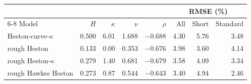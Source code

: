 \begin{tabular}{lrrrrrrr}
\toprule
 & & & & & \multicolumn{3}{c}{RMSE (\%)}\\
\cmidrule(lr){6-8}
Model & $H$ & $\kappa$ & $\nu$ & $\rho$ & All & Short & Standard\\
\midrule
Heston-curve-$\kappa$ & 0.500 & 6.01 & 1.688 & $-$0.688 & 4.30 & 5.76 & 3.48\\
rough Heston & 0.133 & 0.00 & 0.353 & $-$0.676 & 3.98 & 3.60 & 4.14\\
rough Heston-$\kappa$ & 0.279 & 1.40 & 0.681 & $-$0.679 & 3.58 & 4.09 & 3.34\\
rough Hawkes Heston & 0.273 & 0.87 & 0.544 & $-$0.643 & 3.40 & 4.94 & 2.46\\
\bottomrule
\end{tabular}
